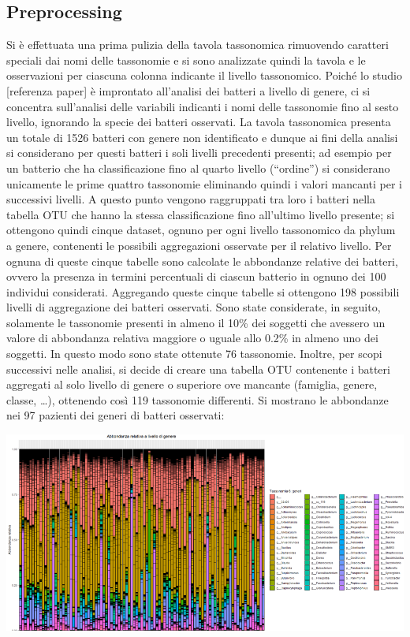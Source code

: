\subsection{Preprocessing}
Si è effettuata una prima pulizia della tavola tassonomica rimuovendo caratteri speciali dai nomi delle tassonomie e si sono analizzate quindi la tavola e le osservazioni per ciascuna colonna indicante il livello tassonomico. Poiché lo studio [referenza paper] è improntato all’analisi dei batteri a livello di genere, ci si concentra sull’analisi delle variabili indicanti i nomi delle tassonomie fino al sesto livello, ignorando la specie dei batteri osservati. La tavola tassonomica presenta un totale di 1526 batteri con genere non identificato e dunque ai fini della analisi si considerano per questi batteri i soli livelli precedenti presenti; ad esempio per un batterio che ha classificazione fino al quarto livello (“ordine”) si considerano unicamente le prime quattro tassonomie eliminando quindi i valori mancanti per i successivi livelli. A questo punto vengono raggruppati tra loro i batteri nella tabella OTU che hanno la stessa classificazione fino all’ultimo livello presente; si ottengono quindi cinque dataset, ognuno per ogni livello tassonomico da phylum a genere, contenenti le possibili aggregazioni osservate per il relativo livello. Per ognuna di queste cinque tabelle sono calcolate le abbondanze relative dei batteri, ovvero la presenza in termini percentuali di ciascun batterio in ognuno dei 100 individui considerati. Aggregando queste cinque tabelle si ottengono 198 possibili livelli di aggregazione dei batteri osservati. Sono state considerate, in seguito, solamente le tassonomie presenti in almeno il 10\% dei soggetti che avessero un valore di abbondanza relativa maggiore o uguale allo 0.2\% in almeno uno dei soggetti. In questo modo sono state ottenute 76 tassonomie.
Inoltre, per scopi successivi nelle analisi, si decide di creare una tabella OTU contenente i batteri aggregati al solo livello di genere o superiore ove mancante (famiglia, genere, classe, …), ottenendo così 119 tassonomie differenti. 
Si mostrano le abbondanze nei 97 pazienti dei generi di batteri osservati:


\vspace*{1cm}
\begin{Figure}
    \centering
    \includegraphics[width=\linewidth,keepaspectratio]{images/abbondanza-generi.png}
  \end{Figure}
 \vspace*{1cm}  

